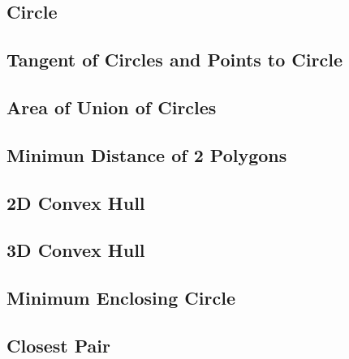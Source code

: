 \documentclass[a4paper,10pt,twocolumn,oneside]{article}
\begin{document}
\subsection{Circle}

\subsection{Tangent of Circles and Points to Circle}

\subsection{Area of Union of Circles}

% 
% 
\subsection{Minimun Distance of 2 Polygons}

\subsection{2D Convex Hull}

\subsection{3D Convex Hull}

% 
\subsection{Minimum Enclosing Circle}

\subsection{Closest Pair}

\end{document}
